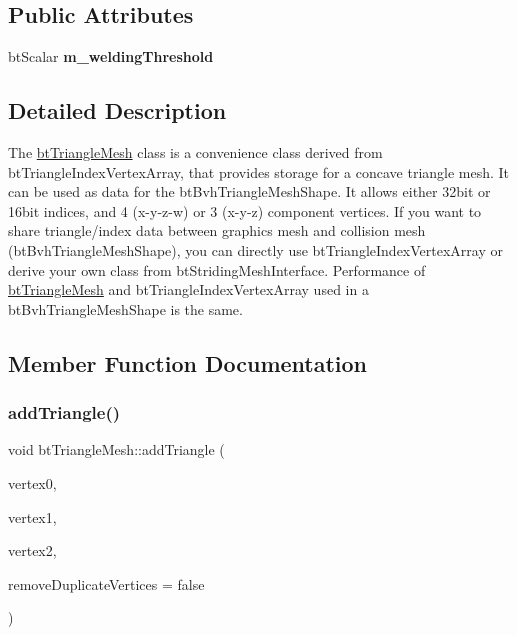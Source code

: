 \subsection*{Public Attributes}
\begin{DoxyCompactItemize}
\item 
\mbox{\label{classbtTriangleMesh_a0b4be6aee36c84cb4d5679cde0ce91f8}} 
bt\+Scalar {\bfseries m\+\_\+welding\+Threshold}
\end{DoxyCompactItemize}


\subsection{Detailed Description}
The \hyperlink{classbtTriangleMesh}{bt\+Triangle\+Mesh} class is a convenience class derived from bt\+Triangle\+Index\+Vertex\+Array, that provides storage for a concave triangle mesh. It can be used as data for the bt\+Bvh\+Triangle\+Mesh\+Shape. It allows either 32bit or 16bit indices, and 4 (x-\/y-\/z-\/w) or 3 (x-\/y-\/z) component vertices. If you want to share triangle/index data between graphics mesh and collision mesh (bt\+Bvh\+Triangle\+Mesh\+Shape), you can directly use bt\+Triangle\+Index\+Vertex\+Array or derive your own class from bt\+Striding\+Mesh\+Interface. Performance of \hyperlink{classbtTriangleMesh}{bt\+Triangle\+Mesh} and bt\+Triangle\+Index\+Vertex\+Array used in a bt\+Bvh\+Triangle\+Mesh\+Shape is the same. 

\subsection{Member Function Documentation}
\mbox{\label{classbtTriangleMesh_a28551d57ae59248a210163a504558583}} 
\subsubsection{\texorpdfstring{add\+Triangle()}{addTriangle()}\hspace{0.1cm}{\footnotesize\ttfamily [1/2]}}
{\footnotesize\ttfamily void bt\+Triangle\+Mesh\+::add\+Triangle (\begin{DoxyParamCaption}\item[{const bt\+Vector3 \&}]{vertex0,  }\item[{const bt\+Vector3 \&}]{vertex1,  }\item[{const bt\+Vector3 \&}]{vertex2,  }\item[{bool}]{remove\+Duplicate\+Vertices = {\ttfamily false} }\end{DoxyParamCaption})}

